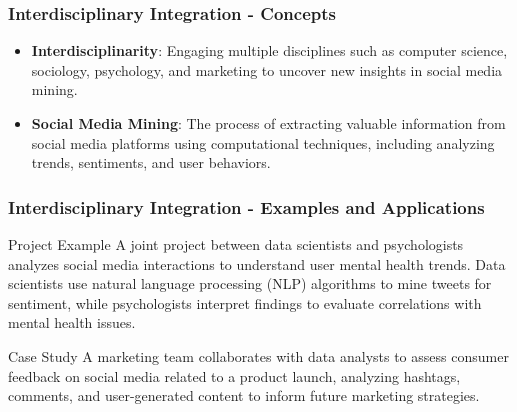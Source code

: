 \documentclass{beamer}
\begin{document}
\begin{frame}[fragile]
    \frametitle{Interdisciplinary Integration - Concepts}
    \begin{itemize}
        \item \textbf{Interdisciplinarity}: Engaging multiple disciplines such as computer science, sociology, psychology, and marketing to uncover new insights in social media mining.
        \item \textbf{Social Media Mining}: The process of extracting valuable information from social media platforms using computational techniques, including analyzing trends, sentiments, and user behaviors.
    \end{itemize}
\end{frame}

\begin{frame}[fragile]
    \frametitle{Interdisciplinary Integration - Examples and Applications}
    \begin{block}{Project Example}
        A joint project between data scientists and psychologists analyzes social media interactions to understand user mental health trends. Data scientists use natural language processing (NLP) algorithms to mine tweets for sentiment, while psychologists interpret findings to evaluate correlations with mental health issues.
    \end{block}
    
    \begin{block}{Case Study}
        A marketing team collaborates with data analysts to assess consumer feedback on social media related to a product launch, analyzing hashtags, comments, and user-generated content to inform future marketing strategies.
    \end{block}
\end{frame}
\end{document}
